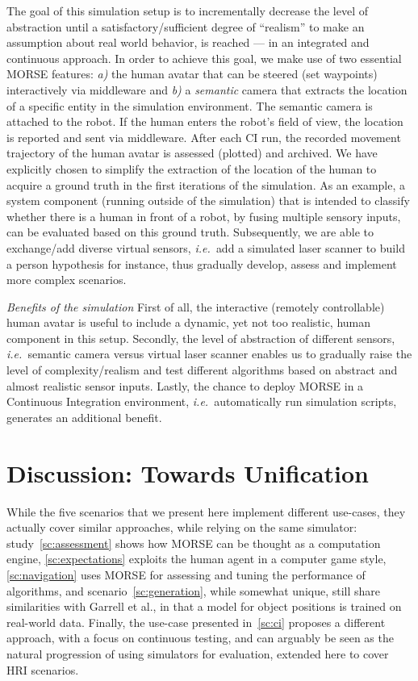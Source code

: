 \documentclass{llncs}
\newcommand{\ie}{{\textit{i.e.~}}}
\begin{document}
The goal of this simulation setup is to incrementally decrease the level of
abstraction until a satisfactory/sufficient degree of ``realism'' to make an
assumption about real world behavior, is reached --- in an integrated and
continuous approach. In order to achieve this goal, we make use of two essential
MORSE features: \textit{a)} the human avatar that can be steered (set waypoints)
interactively via middleware and \textit{b)} a \emph{semantic} camera that
extracts the location of a specific entity in the simulation environment. The
semantic camera is attached to the robot. If the human enters the robot's field
of view, the location is reported and sent via middleware. After each CI run,
the recorded movement trajectory of the human avatar is assessed (plotted) and
archived. We have explicitly chosen to simplify the extraction of the location
of the human to acquire a ground truth in the first iterations of the
simulation. As an example, a system component (running outside of the simulation) 
that is intended to classify whether there is a human in front of a robot, by fusing 
multiple sensory inputs, can be evaluated based on this ground truth. Subsequently, 
we are able to exchange/add diverse virtual sensors, \ie add a simulated laser 
scanner to build a person hypothesis for instance, thus gradually develop, 
assess and implement more complex scenarios.

\emph{Benefits of the simulation} First of all, the interactive (remotely
controllable) human avatar is useful to include a dynamic, yet not too
realistic, human component in this setup. Secondly, the level of abstraction of different
sensors, \ie semantic camera versus virtual laser scanner enables us to
gradually raise the level of complexity/realism and test different algorithms
based on abstract and almost realistic sensor inputs. Lastly, the chance to
deploy MORSE in a Continuous Integration environment, \ie automatically run
simulation scripts, generates an additional benefit.

\section{Discussion: Towards Unification}

While the five scenarios that we present here implement different use-cases,
they actually cover similar approaches, while relying on the same simulator:
study~\ref{sc:assessment} shows how MORSE can be thought as a computation
engine, \ref{sc:expectations} exploits the human agent in a computer game style,
\ref{sc:navigation} uses MORSE for assessing and tuning the performance of
algorithms, and scenario~\ref{sc:generation}, while somewhat unique, still share
similarities with Garrell et al., in that a model for object positions is
trained on real-world data. Finally, the use-case presented in~\ref{sc:ci}
proposes a different approach, with a focus on continuous testing, and can
arguably be seen as the natural progression of using simulators for evaluation,
extended here to cover HRI scenarios.
\end{document}
